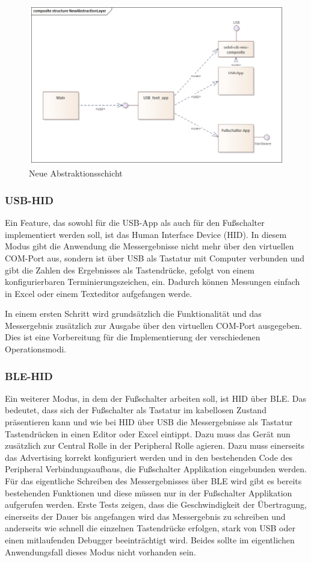\begin{figure}[H] 
	\centering
	\includegraphics[width=\textwidth]{figures/NewAbstractionLayer.png}
	\caption{Neue Abstraktionsschicht}
\end{figure}

\subsubsection{USB-HID}
Ein Feature, das sowohl für die USB-App als auch für den Fußschalter implementiert werden soll, ist das Human Interface Device (HID). In diesem Modus gibt die Anwendung die Messergebnisse nicht mehr über den virtuellen COM-Port aus, sondern ist über USB als Tastatur mit Computer verbunden und gibt die Zahlen des Ergebnisses als Tastendrücke, gefolgt von einem konfigurierbaren Terminierungszeichen, ein. Dadurch können Messungen einfach in Excel oder einem Texteditor aufgefangen werde. 

In einem ersten Schritt wird grundsätzlich die Funktionalität und das Messergebnis zusätzlich zur Ausgabe über den virtuellen COM-Port ausgegeben. Dies ist eine Vorbereitung für die Implementierung der verschiedenen Operationsmodi. 

\subsubsection{BLE-HID}
Ein weiterer Modus, in dem der Fußschalter arbeiten soll, ist HID über BLE. Das bedeutet, dass sich der Fußschalter als Tastatur im kabellosen Zustand präsentieren kann und wie bei HID über USB die Messergebnisse als Tastatur Tastendrücken in einen Editor oder Excel eintippt. Dazu muss das Gerät nun zusätzlich zur Central Rolle in der Peripheral Rolle agieren. Dazu muss einerseits das Advertising korrekt konfiguriert werden und in den bestehenden Code des Peripheral Verbindungsaufbaus, die Fußschalter Applikation eingebunden werden. Für das eigentliche Schreiben des Messergebnisses über BLE wird gibt es bereits bestehenden Funktionen und diese müssen nur in der Fußschalter Applikation aufgerufen werden. Erste Tests zeigen, dass die Geschwindigkeit der Übertragung, einerseits der Dauer bis angefangen wird das Messergebnis zu schreiben und anderseits wie schnell die einzelnen Tastendrücke erfolgen, stark von USB oder einen mitlaufenden Debugger beeinträchtigt wird. Beides sollte im eigentlichen Anwendungsfall dieses Modus nicht vorhanden sein. 

